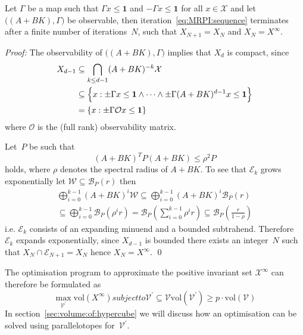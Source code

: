 \documentclass{ifacconf}
\def\bpf{\textnormal{\textit{Proof:}\hspace{1ex}}}
\def\epf{\hfill \mbox{\qed}}%
\providecommand{\vol}{\text{vol}}
\newcommand{\Obs}{\mathcal{O}}
\providecommand{\B}{\mathcal B}
\providecommand{\E}{\mathcal E}
\providecommand{\W}{\mathcal W}
\providecommand{\V}{\mathcal V}
\providecommand{\X}{\mathcal X}
\providecommand{\bfa}[1]{\mathbf{#1}}
\begin{document}
\vspace{0.5\baselineskip}
\begin{thm}
Let $\Gamma$ be a map such that $\Gamma x\leq\bfa{1}$ and $-\Gamma x\leq\bfa{1}$ for all $x\in\X$ and let $\bigl((A+BK),\Gamma\bigr)$ be observable, then iteration~\eqref{eq:MRPI:sequence} terminates after a finite number of iterations~$N$, such that $X_{N+1}=X_N$ and $X_N=X^\infty$.
\end{thm}
%
\bpf
%
The observability of $\bigl((A+BK),\Gamma\bigr)$ implies that $X_d$ is compact, since 
\begin{align*}
X_{d-1} 
&\subseteq\bigcap_{k\leq d-1}(A+BK)^{-k}\X\\
&\subseteq \Bigl\{x:\pm\Gamma x\leq\bfa{1}\wedge\dots\wedge\pm\Gamma(A+BK)^{d-1} x\leq\bfa{1} \Bigr\}\\
& = \{x:\pm\Gamma \Obs x\leq \bfa{1}\}
\end{align*}
where $\Obs$ is the (full rank) observability matrix.

Let~$P$ be such that 
\[
(A+BK)^TP(A+BK) \leq \rho^2P
\]
holds, where $\rho$ denotes the spectral radius of $A+BK$.
%
To see that $\E_k$ grows exponentially let $\W\subseteq\B_P(r)$ then
%
\begin{multline*}
  \bigoplus_{i=0}^{k-1}(A+BK)^i\W \subseteq \bigoplus_{i=0}^{k-1}(A+BK)^i\B_P(r)\\
  \subseteq\bigoplus_{i=0}^{k-1}\B_P(\rho^i r) = \B_P(\sum_{i=0}^{k-1}\rho^i r)\subseteq\B_P(\frac{r}{1-\rho})
\end{multline*}
%
i.e. $\E_k$ consists of an expanding minuend and a bounded subtrahend.
%
Therefore $\E_k$ expands exponentially, since $X_{d-1}$ is bounded there exists an integer~$N$ such that $X_{N}\cap\E_{N+1}=X_N$ hence $X_N=X^\infty$.
%
\epf

The optimisation program to approximate the positive invariant set $\X^\infty$ can therefore be formulated as
%
\begin{subequations}\label{seq:optimisation:MRPI:abstract}
	\begin{equation}
		\max_{\V^\prime} \vol(X^\infty)
	\end{equation}
%
	subject to
%
\begin{equation}
	\V^\prime\subseteq\V
\end{equation}
%
\begin{equation}
	\vol(\V^\prime)\geq p\cdot\vol(\V)
\end{equation}
\end{subequations}
%
In section~\ref{sec:volume:of:hypercube} we will discuss how an optimisation can be solved using parallelotopes for~$\V^\prime$.
\end{document}
